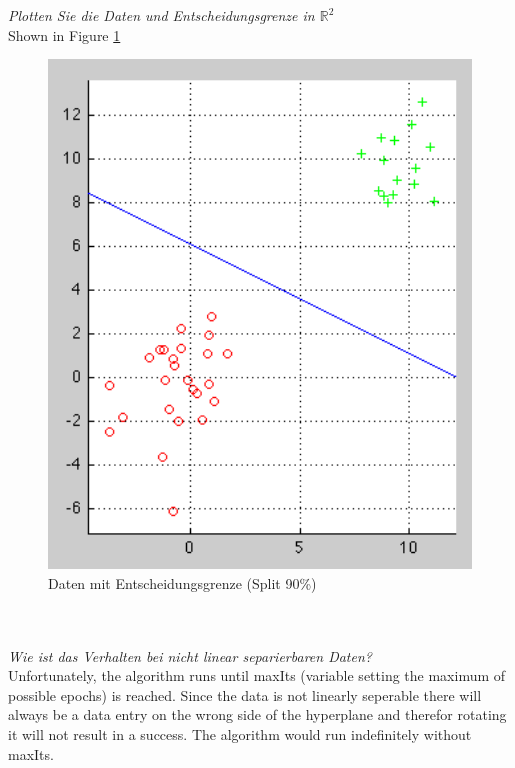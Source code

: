 \documentclass[12pt]{article}
\def\x#1#2{$\mathbb{#1}^#2$}
\def\n#1{\x#1}
\begin{document}
\textit{Plotten Sie die Daten und Entscheidungsgrenze in \n{R2}}
\\
Shown in Figure \ref{fig:entscheidung}
\\
\begin{figure}[htp]
	\centering
	\includegraphics[width=1\textwidth]{ab1_1_2.png}
	\caption{Daten mit Entscheidungsgrenze (Split 90\%) }
	\label{fig:entscheidung}
\end{figure}
\\
\\

\textit{Wie ist das Verhalten bei nicht linear separierbaren Daten?}
\\
Unfortunately, the algorithm runs until maxIts (variable setting the maximum of possible epochs) is reached. Since the data is not linearly seperable there will always be a data entry on the wrong side of the hyperplane and therefor rotating it will not result in a success. The algorithm would run indefinitely without maxIts. 
\end{document}
